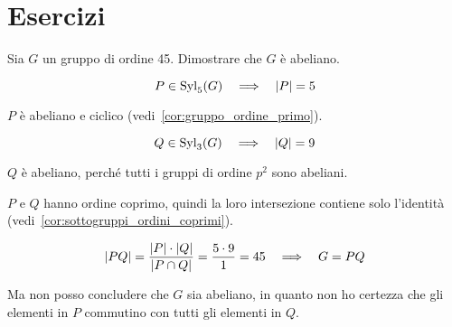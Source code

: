 \chapter{Esercizi}
\label{ch:esercizi_settimana_4}

\begin{esercizio}
    Sia $G$ un gruppo di ordine 45.
    Dimostrare che $G$ è abeliano.
\end{esercizio}
\begin{soluzione}
    \begin{equation*}
        P \in \operatorname{Syl}_5(G) \quad\Longrightarrow\quad \lvert P \rvert = 5
    \end{equation*}

    $P$ è abeliano e ciclico (vedi~\ref{cor:gruppo_ordine_primo}).

    \begin{equation*}
        Q \in \operatorname{Syl}_3(G) \quad\Longrightarrow\quad \lvert Q \rvert = 9
    \end{equation*}

    $Q$ è abeliano, perché tutti i gruppi di ordine $p^2$ sono abeliani.

    $P$ e $Q$ hanno ordine coprimo, quindi la loro intersezione contiene solo l'identità
    (vedi~\ref{cor:sottogruppi_ordini_coprimi}).

    \begin{equation*}
        \lvert PQ \rvert = \dfrac{\lvert P \rvert \cdot \lvert Q \rvert}{\lvert P \cap Q \rvert} = \dfrac{5 \cdot 9}{1} = 45 \quad\Longrightarrow\quad G = PQ
    \end{equation*}

    Ma non posso concludere che $G$ sia abeliano, in quanto non ho certezza che gli elementi in $P$ commutino con tutti
    gli elementi in $Q$.
\end{soluzione}